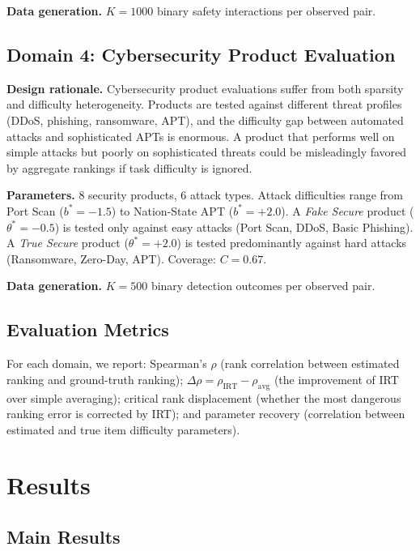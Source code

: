 \documentclass[11pt,a4paper]{article}
\begin{document}
\textbf{Data generation.} $K = 1000$ binary safety interactions per observed pair.

\subsection{Domain 4: Cybersecurity Product Evaluation}

\textbf{Design rationale.} Cybersecurity product evaluations suffer from both sparsity and difficulty heterogeneity. Products are tested against different threat profiles (DDoS, phishing, ransomware, APT), and the difficulty gap between automated attacks and sophisticated APTs is enormous. A product that performs well on simple attacks but poorly on sophisticated threats could be misleadingly favored by aggregate rankings if task difficulty is ignored.

\textbf{Parameters.} 8 security products, 6 attack types. Attack difficulties range from Port Scan ($b^* = -1.5$) to Nation-State APT ($b^* = +2.0$). A \emph{Fake Secure} product ($\theta^* = -0.5$) is tested only against easy attacks (Port Scan, DDoS, Basic Phishing). A \emph{True Secure} product ($\theta^* = +2.0$) is tested predominantly against hard attacks (Ransomware, Zero-Day, APT). Coverage: $C = 0.67$.

\textbf{Data generation.} $K = 500$ binary detection outcomes per observed pair.

\subsection{Evaluation Metrics}

For each domain, we report: Spearman's $\rho$ (rank correlation between estimated ranking and ground-truth ranking); $\Delta\rho = \rho_{\text{IRT}} - \rho_{\text{avg}}$ (the improvement of IRT over simple averaging); critical rank displacement (whether the most dangerous ranking error is corrected by IRT); and parameter recovery (correlation between estimated and true item difficulty parameters).

\section{Results}

\subsection{Main Results}
\end{document}
